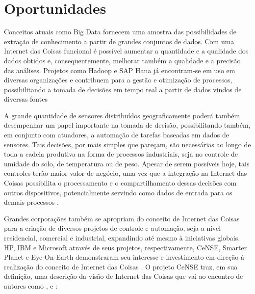 \documentclass[twoside,english,brazilian]{UNISINOSmonografia}
\begin{document}
\section{Oportunidades}


Conceitos atuais como Big Data fornecem uma amostra das possibilidades de 
extração de conhecimento a partir de grandes conjuntos de dados. 
Com uma Internet das Coisas funcional é possível aumentar a quantidade e a 
qualidade dos dados obtidos e, consequentemente, melhorar também a 
qualidade e a precisão das análises.
Projetos como Hadoop e SAP Hana já encontram-se em uso em diversas 
organizações e contribuem para a gestão e otimização de processos, 
possibilitando a tomada de decisões em tempo real a partir de dados 
vindos de diversas fontes


A grande quantidade de sensores distribuídos geograficamente poderá também 
desempenhar um papel importante na tomada de decisão, possibilitando também, 
em conjunto com atuadores, a automação de tarefas baseadas em dados de 
sensores.
Tais decisões, por mais simples que pareçam, são necessárias ao longo de toda 
a cadeia produtiva na forma de processos industriais, seja no controle de 
umidade do solo, de temperatura ou de peso.
Apesar de serem possíveis hoje, tais controles terão maior valor de negócio, 
uma vez que a integração na Internet das Coisas possibilita o processamento e 
o compartilhamento dessas decisões com outros dispositivos, potencialmente 
servindo como dados de entrada para os demais processos \cite{ITU2005}.


Grandes corporações também se apropriam do conceito de Internet das Coisas 
para a criação de diversos projetos de controle e automação, seja a nível 
residencial, comercial e industrial, expandindo até mesmo à iniciativas 
globais.
HP, IBM e Microsoft através de seus projetos, respectivamente, CeNSE, Smarter 
Planet e Eye-On-Earth demonstraram seu interesse e investimento em direção à 
realização do conceito de Internet das Coisas \cite{Coetzee2011}.
O projeto CeNSE traz, em sua definição, uma descrição da visão de Internet das 
Coisas que vai ao encontro de autores como , 
 e :
\end{document}

